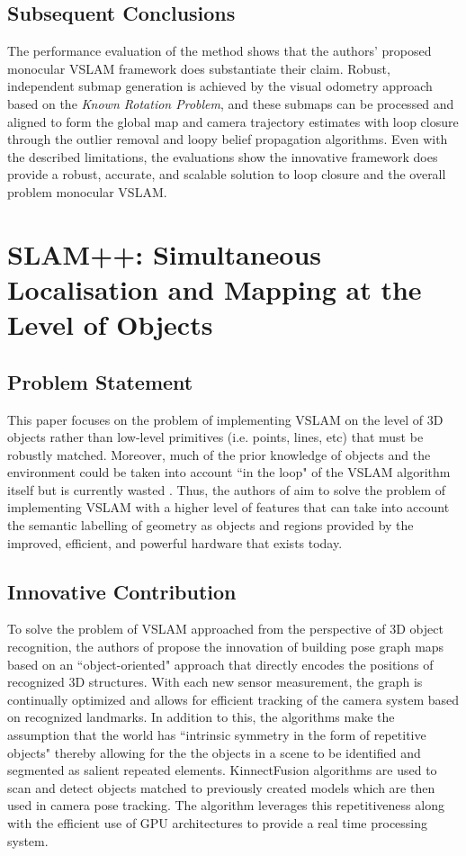 \documentclass[10pt,twocolumn,letterpaper]{article}
\begin{document}
\subsection{Subsequent Conclusions}
The performance evaluation of the method shows that the authors' proposed monocular VSLAM framework does
 substantiate their claim. Robust, independent submap generation is achieved by the visual odometry approach 
based on the \textit{Known Rotation Problem}, and these submaps can be processed and aligned to form the 
global map and camera trajectory estimates with loop closure through the outlier removal and loopy belief 
propagation algorithms. Even with the described limitations, the evaluations show the innovative framework does 
provide a robust, accurate, and scalable solution to loop closure and the overall problem monocular VSLAM.

\section {SLAM++: Simultaneous Localisation and Mapping at the Level of Objects}
\subsection{Problem Statement}
This paper focuses on the problem of implementing VSLAM on the level of 3D objects rather than low-level 
primitives (i.e. points, lines, etc) that must be robustly matched. Moreover, much of the prior knowledge of
 objects and the environment could be taken into account ``in the loop" of the VSLAM algorithm itself but is 
 currently wasted \cite{Salas-Moreno_2013_CVPR}. Thus, the authors of \cite{Salas-Moreno_2013_CVPR} 
 aim to solve the problem of implementing VSLAM with a higher level of features that can take into account the semantic labelling of geometry as objects and regions provided by the improved, efficient, and powerful hardware that exists today.

\subsection{Innovative Contribution}
To solve the problem of VSLAM approached from the perspective of 3D object recognition, the authors of \cite{Salas-Moreno_2013_CVPR} propose the innovation of building pose graph maps based on an ``object-oriented" approach that directly encodes the positions of recognized 3D structures. With each new sensor measurement, the graph is continually optimized and allows for efficient tracking of the camera system based on recognized landmarks. In addition to this, the algorithms make the assumption that the world has ``intrinsic symmetry in the form of repetitive objects" thereby allowing for the the objects in a scene to be identified and segmented as salient repeated elements. KinnectFusion algorithms are used to scan and detect objects matched to previously created models which are then used in camera pose tracking. The algorithm leverages this repetitiveness along with the efficient use of GPU architectures to provide a real time processing system. 
\end{document}
